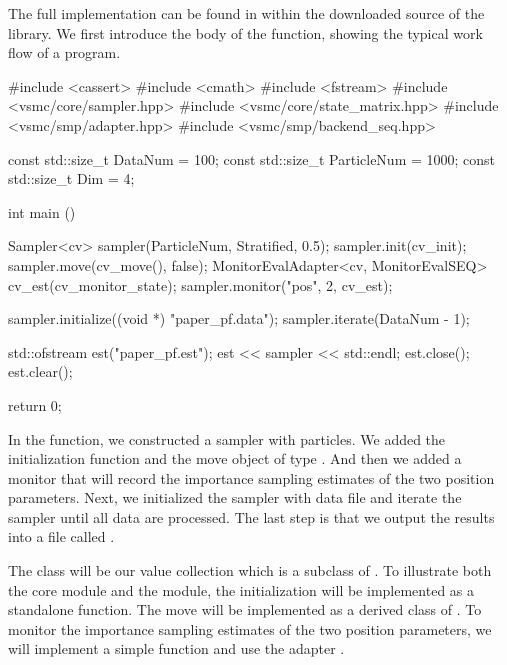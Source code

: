 \documentclass[11pt, fontset=Minion, showoverfull,
bib, biblatexstyle=numeric, mintcode, minted=cache]{marticle}
\begin{document}
The full implementation can be found in
 within the downloaded source of
the library. We first introduce the body of the  function,
showing the typical work flow of a \vsmc program.
\begin{cppcode}
#include <cassert>
#include <cmath>
#include <fstream>
#include <vsmc/core/sampler.hpp>
#include <vsmc/core/state_matrix.hpp>
#include <vsmc/smp/adapter.hpp>
#include <vsmc/smp/backend_seq.hpp>

const std::size_t DataNum = 100;
const std::size_t ParticleNum = 1000;
const std::size_t Dim = 4;

int main ()
{
    Sampler<cv> sampler(ParticleNum, Stratified, 0.5);
    sampler.init(cv_init);
    sampler.move(cv_move(), false);
    MonitorEvalAdapter<cv, MonitorEvalSEQ> cv_est(cv_monitor_state);
    sampler.monitor("pos", 2, cv_est);

    sampler.initialize((void *) "paper_pf.data");
    sampler.iterate(DataNum - 1);

    std::ofstream est("paper_pf.est");
    est << sampler << std::endl;
    est.close();
    est.clear();

    return 0;
}
\end{cppcode}
In the  function, we constructed a sampler with
 particles. We added the initialization function
 and the move object of type . And then
we added a monitor that will record the importance sampling estimates of the
two position parameters. Next, we initialized the sampler with data file
 and iterate the sampler until all data are
processed. The last step is that we output the results into a file called
.

The class  will be our value collection which is a subclass of
. To illustrate both the core
module and the \smp module, the initialization  will be
implemented as a standalone function. The move  will be
implemented as a derived class of . To monitor the
importance sampling estimates of the two position parameters, we will
implement a simple function  and use the adapter
.
\end{document}
